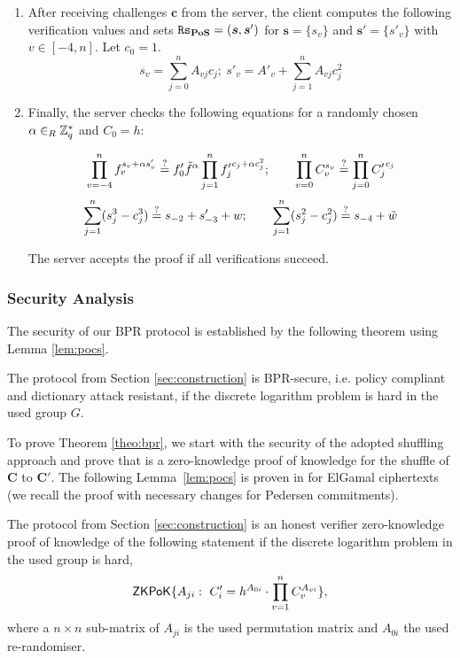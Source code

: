 \begin{enumerate}
\item After receiving challenges $\bm c$ from the server, the client computes the following verification values and sets \allowbreak $\mathtt{Rs}_\mathsf{\bf PoS}=(\bm s, \bm s')$ for $\bm s = \{s_v\}$ and $\bm s' = \{s'_v\}$ with $v\in[-4,n]$.
Let $c_0=1$.
\[ s_v = \sum_{j=0}^{n} A_{vj}c_j;~ s'_v = A'_v + \sum_{j=1}^{n} A_{vj}c_j^2 \] %


\item Finally, the server checks the following equations for a randomly chosen $\alpha\in_R\mathbb{Z}^\ast_q$ and $C_0=h$:

\[  \prod_{v=-4}^{n} f_v^{s_v+\alpha s'_v} \stackrel{?}{=} f'_0\tilde{f}^\alpha \prod_{j=1}^n {f'_j}^{c_j+\alpha c_j^2};\hspace*{2em}
    \prod_{v=0}^n C_v^{s_v} \stackrel{?}{=} \prod_{j=0}^n {C'_j}^{c_j} \]
\[  \sum_{j=1}^n (s_j^3 - c_j^3) \stackrel{?}{=} s_{-2} + s'_{-3} + w;\hspace*{2em}
    \sum_{j=1}^n (s_j^2 - c_j^2) \stackrel{?}{=} s_{-4} + \tilde{w} \]

\noindent
The server accepts the \PoS proof if all verifications succeed.

\end{enumerate}

\subsubsection{Security Analysis}
The security of our \ac{BPR} protocol is established by the following theorem using Lemma \ref{lem:pocs}.

\begin{theorem}\label{theo:bpr}
  The protocol from Section \ref{sec:construction} is \ac{BPR}-secure, i.e. policy compliant and dictionary attack resistant, if the discrete logarithm problem is hard in the used group $G$.
\end{theorem}

\noindent
To prove Theorem \ref{theo:bpr}, we start with the security of the adopted shuffling approach and prove that \PoS is a zero-knowledge proof of knowledge for the shuffle of $\bm C$ to $\bm C'$.
The following Lemma~\ref{lem:pocs} is proven in \cite{Furukawa05} for ElGamal ciphertexts (we recall the proof with necessary changes for Pedersen commitments).

\begin{lemma} \label{lem:pocs}
  The \PoS protocol from Section \ref{sec:construction} is an honest verifier zero-knowledge proof of knowledge of the following statement if the discrete logarithm problem in the used group is hard,
  \[\mathsf{ZKPoK}\{A_{ji}:~ C'_i=h^{A_{0i}}\cdot\prod_{v=1}^n C_v^{A_{vi}}\},\]
  where a $n\times n$ sub-matrix of $A_{ji}$ is the used permutation matrix and $A_{0i}$ the used re-randomiser.
\end{lemma}

